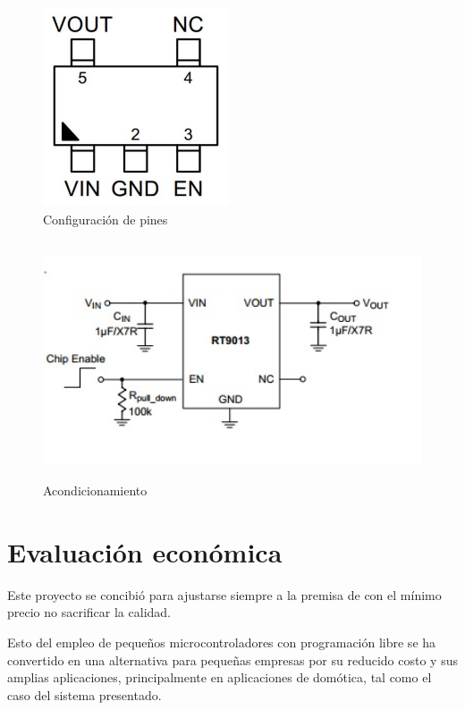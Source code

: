 \vspace{1cm}

\begin{figure}[H]
    \centering
    \includegraphics[width=5.5cm, height=6cm]{imagenes/esquematico RT9013.pdf}
    \caption{Configuración de pines}
    \label{imag:pines_RT9013}
\end{figure}

\begin{figure}[H]
    \centering
    \includegraphics[width=12cm, height=7cm]{imagenes/acondicionamiento RT9013.jpg}
    \caption{Acondicionamiento}
    \label{imag:acondicionamiento_RT9013}
\end{figure}

\section{Evaluación económica}

Este proyecto se concibió para ajustarse siempre a la premisa de con el mínimo precio no sacrificar la calidad.

Esto del empleo de pequeños microcontroladores con programación libre se ha convertido en una alternativa para pequeñas empresas por su reducido costo y sus amplias aplicaciones, principalmente en aplicaciones de domótica, tal como el caso del sistema presentado.

